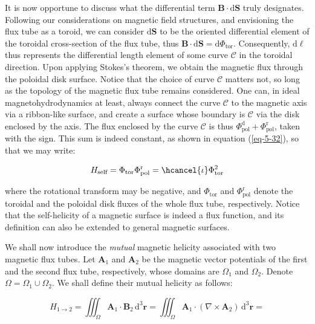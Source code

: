 It is now opportune to discuss what the differential term $\mathbf{B}\cdot\mathrm{d}\mathbf{S}$ truly designates. Following our considerations on magnetic field structures, and envisioning the flux tube as a toroid, we can consider $\mathrm{d}\mathbf{S}$ to be the oriented differential element of the toroidal cross-section of the flux tube, thus $\mathbf{B}\cdot\mathrm{d}\mathbf{S}=\mathrm{d}\Phi_\text{tor}$. Consequently, $\mathrm{d}\boldsymbol{\ell}$ thus represents the differential length element of some curve $\mathcal{C}$ in the toroidal direction. Upon applying Stokes's theorem, we obtain the magnetic flux through the poloidal disk surface. Notice that the choice of curve $\mathcal{C}$ matters not, so long as the topology of the magnetic flux tube remains considered. One can, in ideal magnetohydrodynamics at least, always connect the curve $\mathcal{C}$ to the magnetic axis via a ribbon-like surface, and create a surface whose boundary is $\mathcal{C}$ via the disk enclosed by the axis. The flux enclosed by the curve $\mathcal{C}$ is thus $\Phi_\text{pol}^\mathrm{d}+\Phi_\text{pol}^\text{r}$, taken with the sign. This sum is indeed constant, as shown in equation (\ref{eq-5-32}), so that we may write:

\begin{equation}
    H_\text{self}=\Phi_\text{tor}\Phi_\text{pol}^\text{r}=\hcancel{\iota}\Phi_\text{tor}^2
\end{equation}

where the rotational transform may be negative, and $\Phi_\text{tor}$ and $\Phi_\text{pol}^\text{r}$ denote the toroidal and the poloidal disk fluxes of the whole flux tube, respectively. Notice that the self-helicity of a magnetic surface is indeed a flux function, and its definition can also be extended to general magnetic surfaces.

\quad We shall now introduce the \textit{mutual} magnetic helicity associated with two magnetic flux tubes. Let $\mathbf{A}_1$ and $\mathbf{A}_2$ be the magnetic vector potentials of the first and the second flux tube, respectively, whose domains are $\Omega_1$ and $\Omega_2$. Denote $\Omega=\Omega_1\cup\Omega_2$. We shall define their mutual helicity as follows:

\begin{equation}
    H_{1\to2}=\iiint_{\Omega}\mathbf{A}_1\cdot\mathbf{B}_2\,\mathrm{d}^3\mathbf{r}=\iiint_{\Omega}\mathbf{A}_1\cdot(\nabla\times\mathbf{A}_2)\,\mathrm{d}^3\mathbf{r}=
\end{equation}

